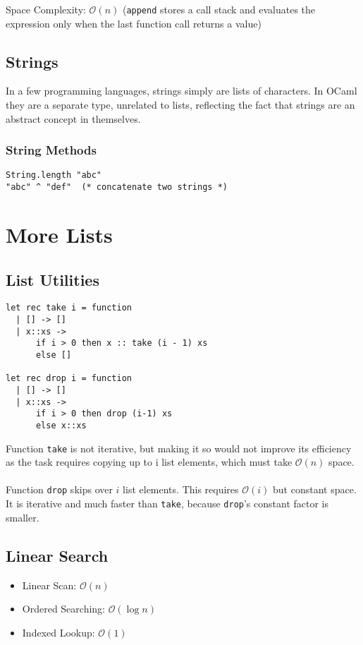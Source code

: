 \documentclass[12pt,a4paper]{article} %
\begin{document}
Space Complexity: $\mathcal{O}(n)$ (\verb|append| stores a call stack and evaluates the expression only when the last function call returns a value)
\subsection{Strings}
In a few programming languages, strings simply are lists of characters. In OCaml they are a separate type, unrelated to lists, reflecting the fact that strings are an abstract concept in themselves.
\subsubsection{String Methods}
\begin{lstlisting}[language=caml]
String.length "abc"
"abc" ^ "def"  (* concatenate two strings *)
\end{lstlisting}
\section{More Lists}
\subsection{List Utilities}
\begin{lstlisting}[language=caml]
let rec take i = function
  | [] -> []
  | x::xs ->
      if i > 0 then x :: take (i - 1) xs
      else []
      
let rec drop i = function
  | [] -> []
  | x::xs ->
      if i > 0 then drop (i-1) xs
      else x::xs
\end{lstlisting}
Function \verb|take| is not iterative, but making it so would not improve its efficiency as the task requires copying up to i list elements, which must take $\mathcal{O}(n)$ space.
\\\\
Function \verb|drop| skips over $i$ list elements. This requires $\mathcal{O}(i)$ but constant space. It is iterative and much faster than \verb|take|, because \verb|drop|'s constant factor is smaller.
\subsection{Linear Search}
\begin{itemize}
\item Linear Scan: $\mathcal{O}(n)$ 
\item Ordered Searching: $\mathcal{O}(\log n)$ 
\item Indexed Lookup: $\mathcal{O}(1)$ 
\end{itemize}
\end{document}
